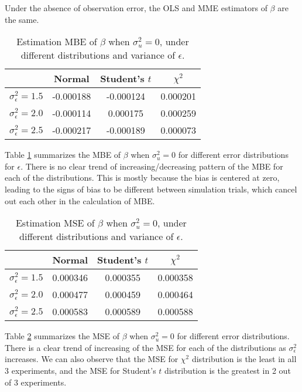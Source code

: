 \documentclass{article}
\begin{document}
Under the absence of observation error, the OLS and MME estimators of $\beta$ are the same.

\begin{table}[ht]
    \centering
    \caption{Estimation MBE of $\beta$ when $\sigma^2_u=0$, under different distributions and variance of $\epsilon$.}
    \label{Tab:MBE_absence}
    \begin{tabular}[t]{lccc}
        \hline
        &Normal&Student's $t$&$\chi^2$\\
        \hline
        $\sigma^2_\epsilon = 1.5$&-0.000188&-0.000124&0.000201\\
        $\sigma^2_\epsilon = 2.0$&-0.000114&0.000175&0.000259\\
        $\sigma^2_\epsilon = 2.5$&-0.000217&-0.000189&0.000073\\
        \hline
    \end{tabular}
\end{table}

Table \ref{Tab:MBE_absence} summarizes the MBE of $\beta$ when $\sigma^2_u=0$ for different error distributions for $\epsilon$.
There is no clear trend of increasing/decreasing pattern of the MBE for each of the distributions. 
This is mostly because the bias is centered at zero, leading to the signs of bias to be different between simulation trials, which cancel out each other in the calculation of MBE. 

\begin{table}[ht]
    \centering
    \caption{Estimation MSE of $\beta$ when $\sigma^2_u=0$, under different distributions and variance of $\epsilon$.}
    \label{Tab:MSE_absence}
    \begin{tabular}[t]{lccc}
        \hline
        &Normal&Student's $t$&$\chi^2$\\
        \hline
        $\sigma^2_\epsilon = 1.5$&0.000346&0.000355&0.000358\\
        $\sigma^2_\epsilon = 2.0$&0.000477&0.000459&0.000464\\
        $\sigma^2_\epsilon = 2.5$&0.000583&0.000589&0.000588\\
        \hline
    \end{tabular}
\end{table}

Table \ref{Tab:MSE_absence} summarizes the MSE of $\beta$ when $\sigma^2_u=0$ for different error distributions.
There is a clear trend of increasing of the MSE for each of the distributions as $\sigma^2_\epsilon$ increases. 
We can also observe that the MSE for $\chi^2$ distribution is the least in all 3 experiments, and the MSE for Student's $t$ distribution is the greatest in 2 out of 3 experiments.
\end{document}
